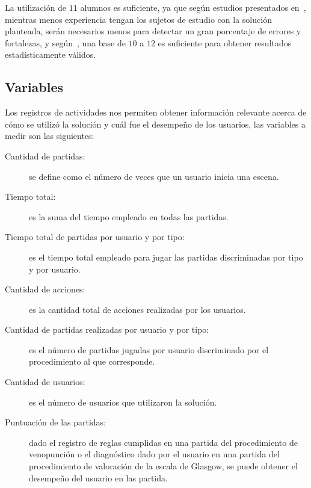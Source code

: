 La utilización de $11$ alumnos es suficiente, ya que según estudios presentados
en~\cite{nielsen2000}, mientras menos experiencia tengan los sujetos de estudio
con la solución planteada, serán necesarios menos para detectar un gran
porcentaje de errores y fortalezas, y según~\cite{ritch2009}, una base de $10$ a
$12$ es suficiente para obtener resultados estadísticamente válidos.

\subsection{Variables}


Los registros de actividades nos permiten obtener información relevante acerca
de cómo se utilizó la solución y cuál fue el desempeño de los usuarios, las variables a medir son 
las siguientes:


\begin{description}

\item[Cantidad de partidas:] se define como el número de veces que un usuario
    inicia una escena. 

\item[Tiempo total:] es la suma del tiempo empleado en todas las partidas.

\item[Tiempo total de partidas por usuario y por tipo:] es el tiempo total 
    empleado para jugar las partidas discriminadas por tipo y por usuario.

\item[Cantidad de acciones:] es la cantidad total de acciones realizadas por 
    los usuarios.
 
\item[Cantidad de partidas realizadas por usuario y por tipo:] es el número de 
    partidas jugadas por usuario discriminado por el procedimiento al que 
    corresponde.

\item[Cantidad de usuarios:] es el número de usuarios que utilizaron la solución.
    
\item[Puntuación de las partidas:] dado el registro de reglas cumplidas en una partida 
    del procedimiento de venopunción o el diagnóstico dado por el usuario 
    en una partida del procedimiento de valoración de la escala de Glasgow, se 
    puede obtener el desempeño del usuario en las partida. 


\end{description}

